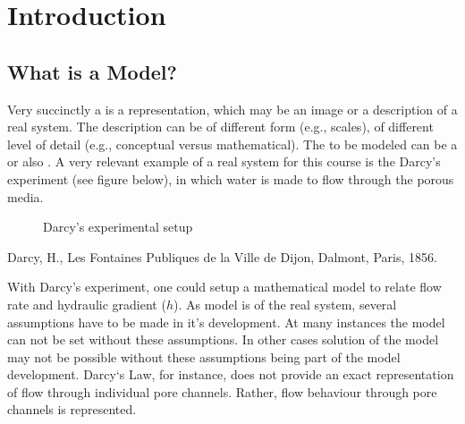 \documentclass[letterpaper,10pt,english]{jupyterBook}
\begin{document}
\section{Introduction}
\label{\detokenize{content/modeling/31_intro_modeling:introduction}}

\subsection{What is a Model?}
\label{\detokenize{content/modeling/31_intro_modeling:what-is-a-model}}
\sphinxAtStartPar
Very succinctly a   is a representation, which may be an image or a description of a real system. The description can be of different form (e.g., scales), of different level of detail (e.g., conceptual versus mathematical). The  to be modeled can be a  or also . A very relevant example of a real system for this course is the Darcy’s experiment (see figure below), in which water is made  to flow through the porous media.

\begin{figure}[htbp]
\centering
\capstart

\noindent{}
\caption{Darcy’s experimental setup\sphinxfootnotemark[1]}\label{\detokenize{content/modeling/31_intro_modeling:darcy}}\end{figure}
%
\begin{footnotetext}[1]\label{\thesphinxscope.1}%
\sphinxAtStartFootnote
Darcy, H., Les Fontaines Publiques de la Ville de Dijon, Dalmont, Paris, 1856.
%
\end{footnotetext}\ignorespaces 
\sphinxAtStartPar
With Darcy’s experiment, one could set\sphinxhyphen{}up a mathematical model to relate flow rate and hydraulic gradient (\(h\)). As model is  of the real system, several assumptions have to be made in it’s development. At many instances the model can not be set without these assumptions. In other cases solution of the model may not be possible without these assumptions being part of the model development. Darcy‘s Law, for instance, does not provide an exact representation of flow through individual pore channels. Rather,  flow behaviour through  pore channels is represented.
\end{document}
